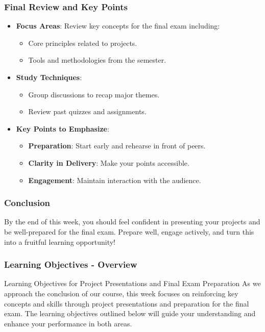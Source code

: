 \documentclass[aspectratio=169]{beamer}
\begin{document}
\begin{frame}[fragile]
    \frametitle{Final Review and Key Points}
    \begin{itemize}
        \item \textbf{Focus Areas}: Review key concepts for the final exam including:
        \begin{itemize}
            \item Core principles related to projects.
            \item Tools and methodologies from the semester.
        \end{itemize}
        
        \item \textbf{Study Techniques}:
        \begin{itemize}
            \item Group discussions to recap major themes.
            \item Review past quizzes and assignments.
        \end{itemize}
        
        \item \textbf{Key Points to Emphasize}:
        \begin{itemize}
            \item \textbf{Preparation}: Start early and rehearse in front of peers.
            \item \textbf{Clarity in Delivery}: Make your points accessible.
            \item \textbf{Engagement}: Maintain interaction with the audience.
        \end{itemize}
    \end{itemize}
\end{frame}

\begin{frame}[fragile]
    \frametitle{Conclusion}
    By the end of this week, you should feel confident in presenting your projects and be well-prepared for the final exam. 
    Prepare well, engage actively, and turn this into a fruitful learning opportunity!
\end{frame}

\begin{frame}[fragile]
    \frametitle{Learning Objectives - Overview}
    \begin{block}{Learning Objectives for Project Presentations and Final Exam Preparation}
        As we approach the conclusion of our course, this week focuses on reinforcing key concepts and skills through project presentations and preparation for the final exam. The learning objectives outlined below will guide your understanding and enhance your performance in both areas.
    \end{block}
\end{frame}
\end{document}

